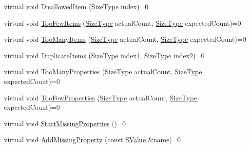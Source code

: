 \begin{DoxyCompactItemize}
\item 
virtual void \mbox{\hyperlink{classrapidjson_1_1internal_1_1_i_validation_error_handler_a4cccd0788979b5809c583ebd75c8bc12}{Disallowed\+Item}} (\mbox{\hyperlink{namespacerapidjson_a44eb33eaa523e36d466b1ced64b85c84}{Size\+Type}} index)=0
\item 
virtual void \mbox{\hyperlink{classrapidjson_1_1internal_1_1_i_validation_error_handler_af86dfc82e6b4bd727ef69fba728dd8e4}{Too\+Few\+Items}} (\mbox{\hyperlink{namespacerapidjson_a44eb33eaa523e36d466b1ced64b85c84}{Size\+Type}} actual\+Count, \mbox{\hyperlink{namespacerapidjson_a44eb33eaa523e36d466b1ced64b85c84}{Size\+Type}} expected\+Count)=0
\item 
virtual void \mbox{\hyperlink{classrapidjson_1_1internal_1_1_i_validation_error_handler_aedeac4d4c121dba2153d22e1f38dbe70}{Too\+Many\+Items}} (\mbox{\hyperlink{namespacerapidjson_a44eb33eaa523e36d466b1ced64b85c84}{Size\+Type}} actual\+Count, \mbox{\hyperlink{namespacerapidjson_a44eb33eaa523e36d466b1ced64b85c84}{Size\+Type}} expected\+Count)=0
\item 
virtual void \mbox{\hyperlink{classrapidjson_1_1internal_1_1_i_validation_error_handler_aab9c02cddc12ea284c53d83193322e49}{Duplicate\+Items}} (\mbox{\hyperlink{namespacerapidjson_a44eb33eaa523e36d466b1ced64b85c84}{Size\+Type}} index1, \mbox{\hyperlink{namespacerapidjson_a44eb33eaa523e36d466b1ced64b85c84}{Size\+Type}} index2)=0
\item 
virtual void \mbox{\hyperlink{classrapidjson_1_1internal_1_1_i_validation_error_handler_af2cb1441d41085df755231be01964b5d}{Too\+Many\+Properties}} (\mbox{\hyperlink{namespacerapidjson_a44eb33eaa523e36d466b1ced64b85c84}{Size\+Type}} actual\+Count, \mbox{\hyperlink{namespacerapidjson_a44eb33eaa523e36d466b1ced64b85c84}{Size\+Type}} expected\+Count)=0
\item 
virtual void \mbox{\hyperlink{classrapidjson_1_1internal_1_1_i_validation_error_handler_a7baac6bdae4e69e6fe187d4dbb9d27ed}{Too\+Few\+Properties}} (\mbox{\hyperlink{namespacerapidjson_a44eb33eaa523e36d466b1ced64b85c84}{Size\+Type}} actual\+Count, \mbox{\hyperlink{namespacerapidjson_a44eb33eaa523e36d466b1ced64b85c84}{Size\+Type}} expected\+Count)=0
\item 
virtual void \mbox{\hyperlink{classrapidjson_1_1internal_1_1_i_validation_error_handler_a0fd6fed1e4200795bb7f0cc29e480596}{Start\+Missing\+Properties}} ()=0
\item 
virtual void \mbox{\hyperlink{classrapidjson_1_1internal_1_1_i_validation_error_handler_a65301d7c2bb6c3031d3ece06006bfc06}{Add\+Missing\+Property}} (const \mbox{\hyperlink{classrapidjson_1_1internal_1_1_i_validation_error_handler_a8a2aaf7eb28a3ce7ed81689141f3af1f}{S\+Value}} \&name)=0

\end{DoxyCompactItemize}
